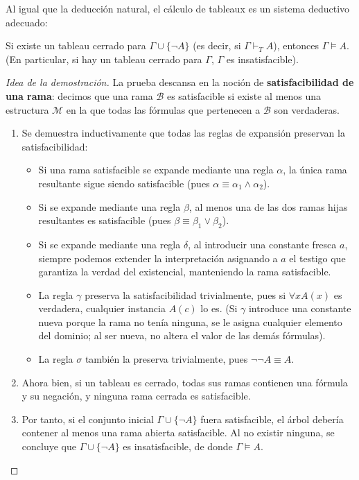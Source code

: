 Al igual que la deducción natural, el cálculo de tableaux es un sistema deductivo adecuado:

\begin{theorem}
Si existe un tableau cerrado para $\Gamma \cup \{\neg A\}$ (es decir, si $\Gamma \vdash_T A$), entonces $\Gamma \models A$.  
(En particular, si hay un tableau cerrado para $\Gamma$, $\Gamma$ es insatisfacible).
\end{theorem}

\begin{proof}[Idea de la demostración]
La prueba descansa en la noción de \textbf{satisfacibilidad de una rama}: decimos que una rama $\mathcal{B}$ es satisfacible si existe al menos una estructura $\mathcal{M}$ en la que todas las fórmulas que pertenecen a $\mathcal{B}$ son verdaderas.
\begin{enumerate}
    \item Se demuestra inductivamente que todas las reglas de expansión preservan la satisfacibilidad:
    \begin{itemize}
        \item Si una rama satisfacible se expande mediante una regla $\alpha$, la única rama resultante sigue siendo satisfacible (pues $\alpha \equiv \alpha_1 \land \alpha_2$).
        \item Si se expande mediante una regla $\beta$, al menos una de las dos ramas hijas resultantes es satisfacible (pues $\beta \equiv \beta_1 \lor \beta_2$).
        \item Si se expande mediante una regla $\delta$, al introducir una constante fresca $a$, siempre podemos extender la interpretación asignando a $a$ el testigo que garantiza la verdad del existencial, manteniendo la rama satisfacible.
        \item La regla $\gamma$ preserva la satisfacibilidad trivialmente, pues si $\forall x A(x)$ es verdadera, cualquier instancia $A(c)$ lo es. (Si $\gamma$ introduce una constante nueva porque la rama no tenía ninguna, se le asigna cualquier elemento del dominio; al ser nueva, no altera el valor de las demás fórmulas).
        \item La regla $\sigma$ también la preserva trivialmente, pues $\neg\neg A \equiv A$.
    \end{itemize}
    \item Ahora bien, si un tableau es cerrado, todas sus ramas contienen una fórmula y su negación, y ninguna rama cerrada es satisfacible.
    \item Por tanto, si el conjunto inicial $\Gamma \cup \{\neg A\}$ fuera satisfacible, el árbol debería contener al menos una rama abierta satisfacible. Al no existir ninguna, se concluye que $\Gamma \cup \{\neg A\}$ es insatisfacible, de donde $\Gamma \models A$. \qedhere
\end{enumerate}
\end{proof}

